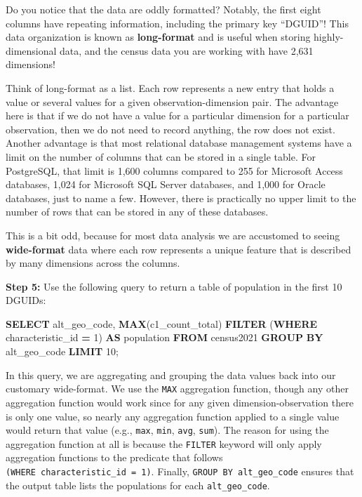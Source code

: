 \documentclass[
]{book}
\newenvironment{Shaded}{\begin{snugshade}}{\end{snugshade}}
\newcommand{\DecValTok}[1]{\textcolor[rgb]{0.00,0.00,0.81}{#1}}
\newcommand{\FunctionTok}[1]{\textcolor[rgb]{0.13,0.29,0.53}{\textbf{#1}}}
\newcommand{\KeywordTok}[1]{\textcolor[rgb]{0.13,0.29,0.53}{\textbf{#1}}}
\newcommand{\NormalTok}[1]{#1}
\newcommand{\OperatorTok}[1]{\textcolor[rgb]{0.81,0.36,0.00}{\textbf{#1}}}
\begin{document}
Do you notice that the data are oddly formatted? Notably, the first eight columns have repeating information, including the primary key ``DGUID''! This data organization is known as \textbf{long-format} and is useful when storing highly-dimensional data, and the census data you are working with have 2,631 dimensions!

Think of long-format as a list. Each row represents a new entry that holds a value or several values for a given observation-dimension pair. The advantage here is that if we do not have a value for a particular dimension for a particular observation, then we do not need to record anything, the row does not exist. Another advantage is that most relational database management systems have a limit on the number of columns that can be stored in a single table. For PostgreSQL, that limit is 1,600 columns compared to 255 for Microsoft Access databases, 1,024 for Microsoft SQL Server databases, and 1,000 for Oracle databases, just to name a few. However, there is practically no upper limit to the number of rows that can be stored in any of these databases.

This is a bit odd, because for most data analysis we are accustomed to seeing \textbf{wide-format} data where each row represents a unique feature that is described by many dimensions across the columns.

\textbf{Step 5:} Use the following query to return a table of population in the first 10 DGUIDs:

\begin{Shaded}
\begin{Highlighting}[]
\KeywordTok{SELECT}\NormalTok{ alt\_geo\_code, }\FunctionTok{MAX}\NormalTok{(c1\_count\_total) }\KeywordTok{FILTER}\NormalTok{ (}\KeywordTok{WHERE}\NormalTok{ characteristic\_id }\OperatorTok{=} \DecValTok{1}\NormalTok{) }\KeywordTok{AS}\NormalTok{ population }
\KeywordTok{FROM}\NormalTok{ census2021 }
\KeywordTok{GROUP} \KeywordTok{BY}\NormalTok{ alt\_geo\_code }
\KeywordTok{LIMIT} \DecValTok{10}\NormalTok{;}
\end{Highlighting}
\end{Shaded}

In this query, we are aggregating and grouping the data values back into our customary wide-format. We use the \texttt{MAX} aggregation function, though any other aggregation function would work since for any given dimension-observation there is only one value, so nearly any aggregation function applied to a single value would return that value (e.g., \texttt{max}, \texttt{min}, \texttt{avg}, \texttt{sum}). The reason for using the aggregation function at all is because the \texttt{FILTER} keyword will only apply aggregation functions to the predicate that follows \texttt{(WHERE\ characteristic\_id\ =\ 1)}. Finally, \texttt{GROUP\ BY\ alt\_geo\_code} ensures that the output table lists the populations for each \texttt{alt\_geo\_code}.
\end{document}
